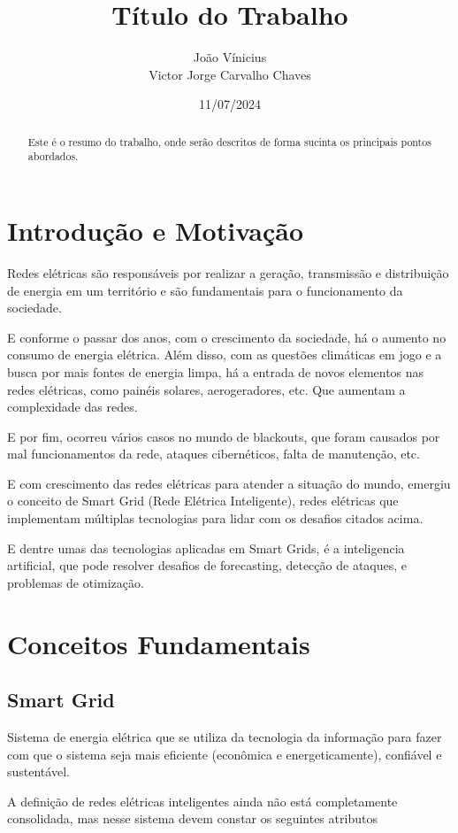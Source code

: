 \documentclass[a4paper,12pt]{article}
\title{Título do Trabalho}
\author{João Vínicius\\
Victor Jorge Carvalho Chaves}
\date{11/07/2024}
\begin{document}
\maketitle
\begin{abstract}
    Este é o resumo do trabalho, onde serão descritos de forma sucinta os principais pontos abordados.
\end{abstract}

\tableofcontents
\newpage

\section{Introdução e Motivação}

Redes elétricas são responsáveis por realizar a geração,
transmissão e distribuição de energia em um território
e são fundamentais para o funcionamento da sociedade.

E conforme o passar dos anos, com o crescimento da sociedade,
há o aumento no consumo de energia elétrica.
Além disso, com as questões climáticas em jogo e a busca por mais fontes de energia limpa,
há a entrada de novos elementos nas redes elétricas, como painéis solares, aerogeradores, etc. Que aumentam a complexidade das redes.

E por fim, ocorreu vários casos no mundo de blackouts, que foram causados por mal funcionamentos da rede, ataques cibernéticos, falta de manutenção, etc.

E com crescimento das redes elétricas para atender a situação do mundo, emergiu o conceito de Smart Grid (Rede Elétrica Inteligente), redes elétricas que implementam múltiplas tecnologias para lidar com os desafios citados acima.

E dentre umas das tecnologias aplicadas em Smart Grids, é a inteligencia artificial, que pode resolver desafios de forecasting, detecção de ataques, e problemas de otimização.

\section{Conceitos Fundamentais}
\subsection{Smart Grid}
Sistema de energia elétrica que se utiliza da tecnologia da informação para fazer com que o sistema seja mais eficiente (econômica e energeticamente), confiável e sustentável.

A definição de redes elétricas inteligentes ainda não está completamente consolidada, mas nesse sistema devem constar os seguintes atributos
\end{document}
